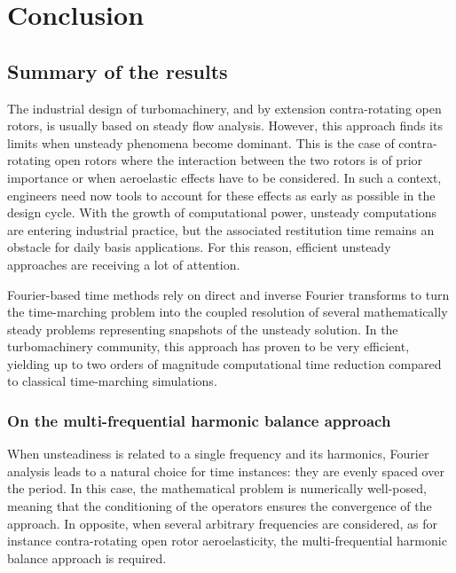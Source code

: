 
\chapter*{Conclusion}

\section*{Summary of the results}
\label{sec:perspectives}

The industrial design of turbomachinery, 
and by extension contra-rotating
open rotors, is usually based on steady flow analysis. 
However, this approach finds its limits 
when unsteady phenomena become dominant. This is the case of 
contra-rotating open rotors where the interaction between the
two rotors is of prior importance or when
aeroelastic effects have to be considered. In such a
context, engineers need now tools to account for these effects as
early as possible in the design cycle. With the growth of
computational power, unsteady computations are entering industrial
practice, but the associated restitution time remains an obstacle for
daily basis applications. For this reason, efficient
unsteady approaches are receiving a lot of attention. 

Fourier-based time methods rely on direct and inverse Fourier transforms
to turn the time-marching problem into the coupled resolution of several
mathematically steady problems representing snapshots of the unsteady
solution. In the turbomachinery community, this approach has
proven to be very efficient, yielding up to two orders of
magnitude computational time reduction compared to classical
time-marching simulations.

\subsection*{On the multi-frequential harmonic balance approach}

When unsteadiness is related to a single frequency and its
harmonics, Fourier analysis leads to a natural choice for time instances:
they are evenly spaced over the period. In this case, the mathematical
problem is numerically well-posed, meaning that the conditioning of
the operators ensures the convergence of the approach.
In opposite, when several arbitrary frequencies are 
considered, as for instance contra-rotating open rotor
aeroelasticity, the multi-frequential harmonic balance approach
is required.

